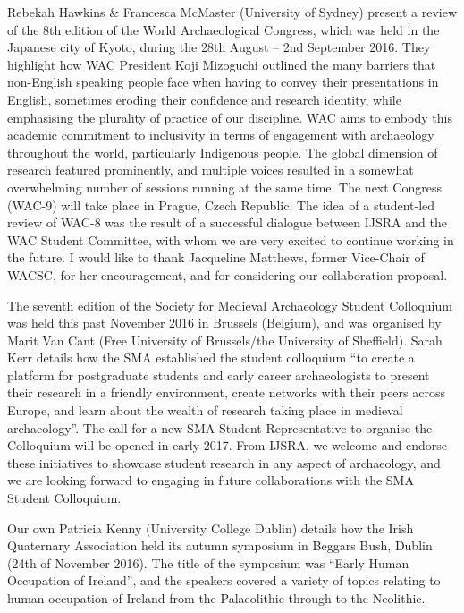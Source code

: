 Rebekah Hawkins \& Francesca McMaster (University of Sydney) present a review of the 8th edition of the World Archaeological Congress, which was held in the Japanese city of Kyoto, during the 28th August – 2nd September 2016. They highlight how WAC President Koji Mizoguchi outlined the many barriers that non-English speaking people face when having to convey their presentations in English, sometimes eroding their confidence and research identity, while emphasising the plurality of practice of our discipline. WAC aims to embody this academic commitment to inclusivity in terms of engagement with archaeology throughout the world, particularly Indigenous people. The global dimension of research featured prominently, and multiple voices resulted in a somewhat overwhelming number of sessions running at the same time. The next Congress (WAC-9) will take place in Prague, Czech Republic. The idea of a student-led review of WAC-8 was the result of a successful dialogue between IJSRA and the WAC Student Committee, with whom we are very excited to continue working in the future. I would like to thank Jacqueline Matthews, former Vice-Chair of WACSC, for her encouragement, and for considering our collaboration proposal.

The seventh edition of the Society for Medieval Archaeology Student Colloquium was held this past November 2016 in Brussels (Belgium), and was organised by Marit Van Cant (Free University of Brussels/the University of Sheffield). Sarah Kerr details how the SMA established the student colloquium “to create a platform for postgraduate students and early career archaeologists to present their research in a friendly environment, create networks with their peers across Europe, and learn about the wealth of research taking place in medieval archaeology”. The call for a new SMA Student Representative to organise the Colloquium will be opened in early 2017.  From IJSRA, we welcome and endorse these initiatives to showcase student research in any aspect of archaeology, and we are looking forward to engaging in future collaborations with the SMA Student Colloquium.

Our own Patricia Kenny (University College Dublin) details how the Irish Quaternary Association held its autumn symposium in Beggars Bush, Dublin (24th of November 2016). The title of the symposium was “Early Human Occupation of Ireland”, and the speakers covered a variety of topics relating to human occupation of Ireland from the Palaeolithic through to the Neolithic.

\IJSRAseparator

